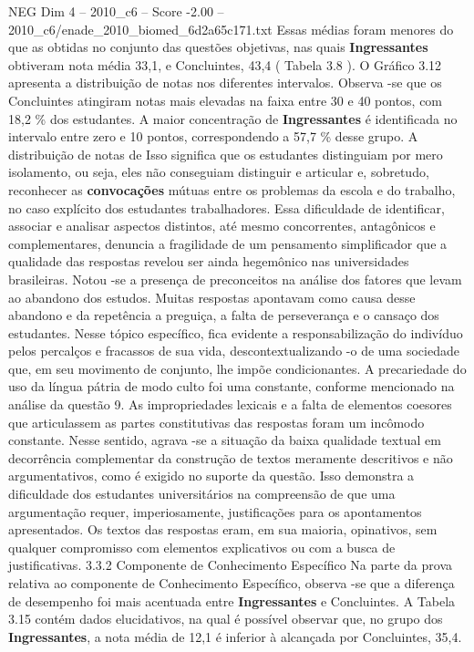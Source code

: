 \begin{textsample}{NEG Dim 4 – 2010\_c6 – Score -2.00 – 2010\_c6/enade\_2010\_biomed\_6d2a65c171.txt}
Essas médias foram menores do que as obtidas no conjunto das questões objetivas, nas quais \textbf{Ingressantes} obtiveram nota média 33,1, e Concluintes, 43,4 ( Tabela 3.8 ).
O Gráfico 3.12 apresenta a distribuição de notas nos diferentes intervalos.
Observa -se que os Concluintes atingiram notas mais elevadas na faixa entre 30 e 40 pontos, com 18,2 \% dos estudantes.
A maior concentração de \textbf{Ingressantes} é identificada no intervalo entre zero e 10 pontos, correspondendo a 57,7 \% desse grupo.
A distribuição de notas de Isso significa que os estudantes distinguiam por mero isolamento, ou seja, eles não conseguiam distinguir e articular e, sobretudo, reconhecer as \textbf{convocações} mútuas entre os problemas da escola e do trabalho, no caso explícito dos estudantes trabalhadores.
Essa dificuldade de identificar, associar e analisar aspectos distintos, até mesmo concorrentes, antagônicos e complementares, denuncia a fragilidade de um pensamento simplificador que a qualidade das respostas revelou ser ainda hegemônico nas universidades brasileiras.
Notou -se a presença de preconceitos na análise dos fatores que levam ao abandono dos estudos.
Muitas respostas apontavam como causa desse abandono e da repetência a preguiça, a falta de perseverança e o cansaço dos estudantes.
Nesse tópico específico, fica evidente a responsabilização do indivíduo pelos percalços e fracassos de sua vida, descontextualizando -o de uma sociedade que, em seu movimento de conjunto, lhe impõe condicionantes.
A precariedade do uso da língua pátria de modo culto foi uma constante, conforme mencionado na análise da questão 9.
As impropriedades lexicais e a falta de elementos coesores que articulassem as partes constitutivas das respostas foram um incômodo constante.
Nesse sentido, agrava -se a situação da baixa qualidade textual em decorrência complementar da construção de textos meramente descritivos e não argumentativos, como é exigido no suporte da questão.
Isso demonstra a dificuldade dos estudantes universitários na compreensão de que uma argumentação requer, imperiosamente, justificações para os apontamentos apresentados.
Os textos das respostas eram, em sua maioria, opinativos, sem qualquer compromisso com elementos explicativos ou com a busca de justificativas. 3.3.2 Componente de Conhecimento Específico Na parte da prova relativa ao componente de Conhecimento Específico, observa -se que a diferença de desempenho foi mais acentuada entre \textbf{Ingressantes} e Concluintes.
A Tabela 3.15 contém dados elucidativos, na qual é possível observar que, no grupo dos \textbf{Ingressantes}, a nota média de 12,1 é inferior à alcançada por Concluintes, 35,4.

\end{textsample}
